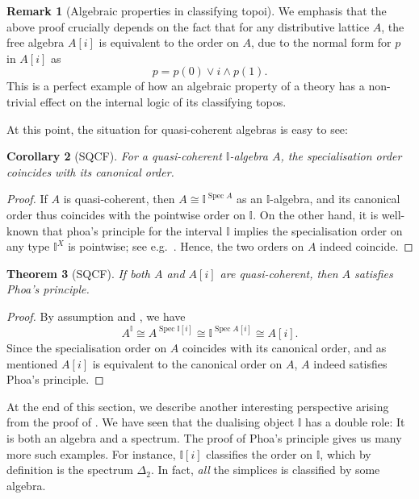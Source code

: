 \documentclass[12pt]{amsart}
\newtheorem{theorem}{Theorem}[section]
\newtheorem{corollary}[theorem]{Corollary}
\theoremstyle{definition}
\newtheorem{remark}[theorem]{Remark}
\newcommand{\mbb}[1]{\mathbb{#1}}
\newcommand{\I}{\mbb I}
\newcommand{\spec}{\operatorname{Spec}}
\begin{document}
\begin{remark}[Algebraic properties in classifying topoi]\label{rem:normalalgebra}
  We emphasis that the above proof crucially depends on the fact that for any distributive lattice $A$, the free algebra $A[i]$ is equivalent to the order on $A$, due to the normal form for $p$ in $A[i]$ as 
  \[ p = p(0) \vee i \wedge p(1). \]
  This is a perfect example of how an algebraic property of a theory has a non-trivial effect on the internal logic of its classifying topos.
\end{remark}

At this point, the situation for quasi-coherent algebras is easy to see:

\begin{corollary}[SQCF]
  For a quasi-coherent $\I$-algebra $A$, the specialisation order coincides with its canonical order.
\end{corollary}
\begin{proof}
  If $A$ is quasi-coherent, then $A \cong \I^{\spec A}$ as an $\I$-algebra, and its canonical order thus coincides with the pointwise order on $\I$. On the other hand, it is well-known that phoa's principle for the interval $\I$ implies the specialisation order on any type $\I^X$ is pointwise; see e.g.~\cite[Thm. 4.2.1]{hyland1990first}. Hence, the two orders on $A$ indeed coincide.
\end{proof}

\begin{theorem}[SQCF]\label{thm:algebraphoa}
  If both $A$ and $A[i]$ are quasi-coherent, then $A$ satisfies Phoa's principle.
\end{theorem}
\begin{proof}
  By assumption and , we have
  \[ A^\I \cong A^{\spec \I[i]} \cong \I^{\spec A[i]} \cong A[i]. \]
  Since the specialisation order on $A$ coincides with its canonical order, and as mentioned $A[i]$ is equivalent to the canonical order on $A$, $A$ indeed satisfies Phoa's principle.
\end{proof}

At the end of this section, we describe another interesting perspective arising from the proof of . We have seen that the dualising object $\I$ has a double role: It is both an algebra and a spectrum. The proof of Phoa's principle gives us many more such examples. For instance, $\I[i]$ classifies the order on $\I$, which by definition is the spectrum $\Delta_2$. In fact, \emph{all} the simplices is classified by some algebra.
\end{document}
